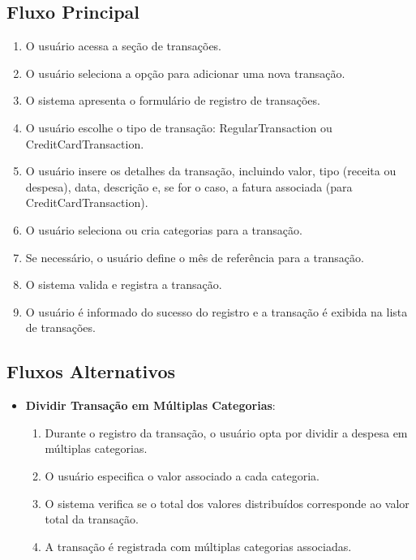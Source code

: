 \subsection*{Fluxo Principal}
\begin{addmargin}[1.5cm]{0cm}
	\begin{enumerate}
		\item O usuário acessa a seção de transações.
		\item O usuário seleciona a opção para adicionar uma nova transação.
		\item O sistema apresenta o formulário de registro de transações.
		\item O usuário escolhe o tipo de transação: RegularTransaction ou CreditCardTransaction.
		\item O usuário insere os detalhes da transação, incluindo valor, tipo (receita ou despesa), data, descrição e, se for o caso, a fatura associada (para CreditCardTransaction).
		\item O usuário seleciona ou cria categorias para a transação.
		\item Se necessário, o usuário define o mês de referência para a transação.
		\item O sistema valida e registra a transação.
		\item O usuário é informado do sucesso do registro e a transação é exibida na lista de transações.
	\end{enumerate}
\end{addmargin}

\subsection*{Fluxos Alternativos}
\begin{addmargin}[1.5cm]{0cm}
	\begin{itemize}
		\item \textbf{Dividir Transação em Múltiplas Categorias}:
		      \begin{enumerate}
		      	\item Durante o registro da transação, o usuário opta por dividir a despesa em múltiplas categorias.
		      	\item O usuário especifica o valor associado a cada categoria.
		      	\item O sistema verifica se o total dos valores distribuídos corresponde ao valor total da transação.
		      	\item A transação é registrada com múltiplas categorias associadas.
		      \end{enumerate}
	\end{itemize}
\end{addmargin}

